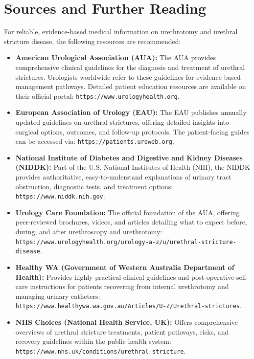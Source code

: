 \section*{Sources and Further Reading}
For reliable, evidence-based medical information on urethrotomy and urethral stricture disease, the following resources are recommended:

\begin{itemize}
  \item \textbf{American Urological Association (AUA):} The AUA provides comprehensive clinical guidelines for the diagnosis and treatment of urethral strictures. Urologists worldwide refer to these guidelines for evidence-based management pathways. Detailed patient education resources are available on their official portal: \texttt{https://www.urologyhealth.org}.
  \item \textbf{European Association of Urology (EAU):} The EAU publishes annually updated guidelines on urethral strictures, offering detailed insights into surgical options, outcomes, and follow-up protocols. The patient-facing guides can be accessed via: \texttt{https://patients.uroweb.org}.
  \item \textbf{National Institute of Diabetes and Digestive and Kidney Diseases (NIDDK):} Part of the U.S. National Institutes of Health (NIH), the NIDDK provides authoritative, easy-to-understand explanations of urinary tract obstruction, diagnostic tests, and treatment options: \texttt{https://www.niddk.nih.gov}.
  \item \textbf{Urology Care Foundation:} The official foundation of the AUA, offering peer-reviewed brochures, videos, and articles detailing what to expect before, during, and after urethroscopy and urethrotomy: \texttt{https://www.urologyhealth.org/urology-a-z/u/urethral-stricture-disease}.
  \item \textbf{Healthy WA (Government of Western Australia Department of Health):} Provides highly practical clinical guidelines and post-operative self-care instructions for patients recovering from internal urethrotomy and managing urinary catheters: \texttt{https://www.healthywa.wa.gov.au/Articles/U-Z/Urethral-strictures}.
  \item \textbf{NHS Choices (National Health Service, UK):} Offers comprehensive overviews of urethral stricture treatments, patient pathways, risks, and recovery guidelines within the public health system: \texttt{https://www.nhs.uk/conditions/urethral-stricture}.
\end{itemize}